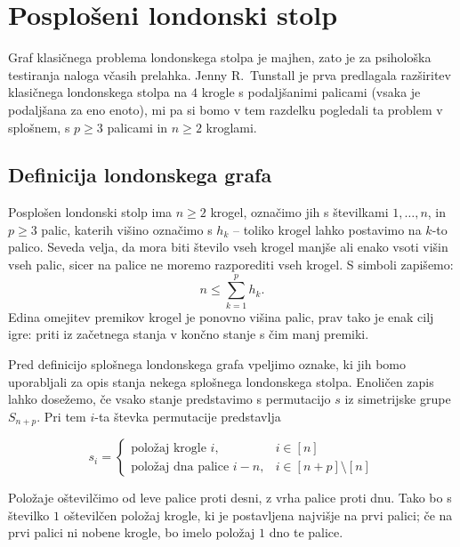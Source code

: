 \documentclass[12pt,a4paper]{amsart}
\theoremstyle{definition} %
\theoremstyle{plain} %
\begin{document}
\section{Posplošeni londonski stolp}
Graf klasičnega problema londonskega stolpa je majhen, zato je za psihološka testiranja naloga včasih prelahka. 
Jenny R.\ Tunstall je prva predlagala razširitev klasičnega londonskega stolpa na $4$ krogle s podaljšanimi palicami (vsaka je podaljšana za eno enoto), mi pa si bomo v tem razdelku pogledali ta problem v splošnem, s $p \geq 3$ palicami in $n \geq 2$ kroglami.

\subsection{Definicija londonskega grafa}

Posplošen londonski stolp ima $n \geq 2$ krogel, označimo jih s številkami $1,\ldots,n$, in $p \geq 3$ palic, katerih višino označimo s $h_k$ -- toliko krogel lahko postavimo na $k$-to palico. Seveda velja, da mora biti število vseh krogel manjše ali enako vsoti višin vseh palic, sicer na palice ne moremo razporediti vseh krogel. S simboli zapišemo:
\[ n \leq \sum_{k=1}^{p} h_k.\]
Edina omejitev premikov krogel je ponovno višina palic, prav tako je enak cilj igre: priti iz začetnega stanja v končno stanje s čim manj premiki.

Pred definicijo splošnega londonskega grafa vpeljimo oznake, ki jih bomo uporabljali za opis stanja nekega splošnega londonskega stolpa. Enoličen zapis lahko dosežemo, če vsako stanje predstavimo s permutacijo $s$ iz simetrijske grupe $S_{n+p}$. Pri tem $i$-ta števka permutacije predstavlja

\[ s_i =
\begin{cases}
    \text{položaj krogle } i, & i \in [n] \\
    \text{položaj dna palice } i-n, & i \in [n+p] \setminus [n]
\end{cases}
\]

Položaje oštevilčimo od leve palice proti desni, z vrha palice proti dnu. Tako bo s številko $1$ oštevilčen položaj krogle, ki je postavljena najvišje na prvi palici; če na prvi palici ni nobene krogle, bo imelo položaj $1$ dno te palice.
\end{document}
